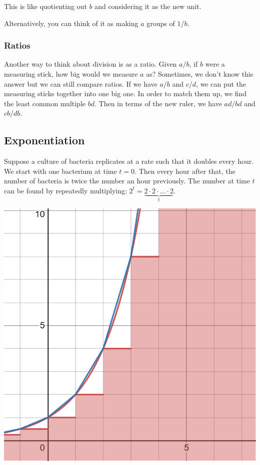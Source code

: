 \documentclass[12pt]{article}
\begin{document}
This is like quotienting out \( b \) and considering it as the new unit.

Alternatively, you can think of it as making \( a \) groups of \( 1/b \).


\subsubsection{Ratios}

Another way to think about division is as a ratio.
Given \( a/b \), if \( b \) were a measuring stick, how big would we measure \( a \) as?
Sometimes, we don't know this answer but we can still compare ratios.
If we have \( a/b \) and \( c/d \), we can put the measuring sticks together into one big one.
In order to match them up, we find the least common multiple \( bd \).
Then in terms of the new ruler, we have \( ad/bd \) and \( cb/db \).


\subsection{Exponentiation}

Suppose a culture of bacteria replicates at a rate such that it doubles every hour.
We start with one bacterium at time \( t = 0 \).
Then every hour after that, the number of bacteria is twice the number an hour previously.
The number at time \( t \) can be found by repeatedly multiplying:
\( 2^t = \underbrace{2 \cdot 2 \cdot \ldots \cdot 2}_t \).

\noindent
\includegraphics[width=\textwidth]{desmos-graph.png}
\end{document}

